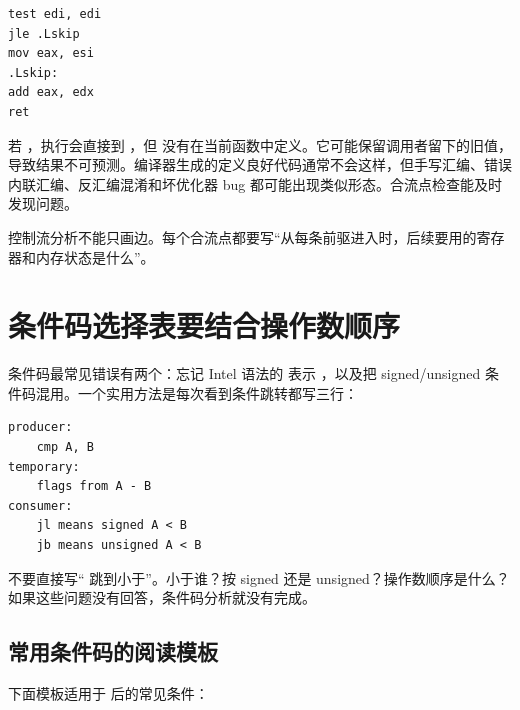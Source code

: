 \begin{lstlisting}
test edi, edi
jle .Lskip
mov eax, esi
.Lskip:
add eax, edx
ret
\end{lstlisting}

若 ，执行会直接到 ，但  没有在当前函数中定义。它可能保留调用者留下的旧值，导致结果不可预测。编译器生成的定义良好代码通常不会这样，但手写汇编、错误内联汇编、反汇编混淆和坏优化器 bug 都可能出现类似形态。合流点检查能及时发现问题。

\begin{warningbox}
控制流分析不能只画边。每个合流点都要写“从每条前驱进入时，后续要用的寄存器和内存状态是什么”。
\end{warningbox}

\section{条件码选择表要结合操作数顺序}

条件码最常见错误有两个：忘记 Intel 语法的  表示 ，以及把 signed/unsigned 条件码混用。一个实用方法是每次看到条件跳转都写三行：

\begin{lstlisting}
producer:
    cmp A, B
temporary:
    flags from A - B
consumer:
    jl means signed A < B
    jb means unsigned A < B
\end{lstlisting}

不要直接写“ 跳到小于”。小于谁？按 signed 还是 unsigned？操作数顺序是什么？如果这些问题没有回答，条件码分析就没有完成。

\subsection{常用条件码的阅读模板}

下面模板适用于  后的常见条件：


